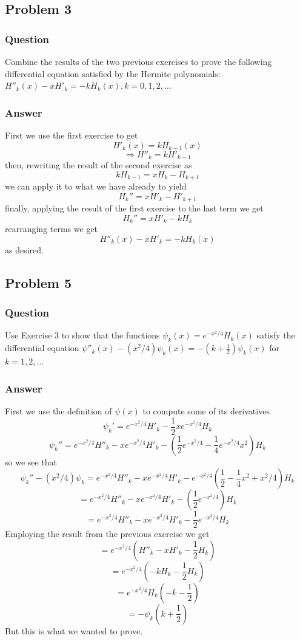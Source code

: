 \documentclass[12pt]{article}
\begin{document}
\subsection{Problem 3}
\subsubsection{Question}

Combine the results of the two previous exercises to prove the following differential equation satisfied by the Hermite polynomials: $H''_k(x)-xH'_k=-kH_k(x), k=0,1,2,\dots$

\subsubsection{Answer}

First we use the first exercise to get 
\[H'_k(x)=kH_{k-1}(x)\]
\[\Rightarrow H''_k=kH'_{k-1}\]
then, rewriting the result of the second exercise as
\[k H_{k-1}=xH_k-H_{k+1}\]
we can apply it to what we have already to yield
\[H_k''=xH'_k-H'_{k+1}\]
finally, applying the result of the first exercise to the last term we get
\[H_k''=xH'_k-kH_{k}\]
rearranging terms we get
\[H''_k(x)-xH'_k=-kH_k(x)\]
as desired.


\subsection{Problem 5}
\subsubsection{Question}

Use Exercise 3 to show that the functions $\psi_k(x)=e^{-x^2/4}H_k(x)$ satisfy the differential equation $\psi''_k (x)-(x^2/4)\psi_k (x) = -(k+\frac{1}{2} ) \psi_k (x)$ for $k=1,2,\dots$

\subsubsection{Answer}

First we use the definition of $\psi(x)$ to compute some of its derivatives
\[\psi_k'=e^{-x^2/4}H'_k-\frac{1}{2}xe^{-x^2/4}H_k\]
\[\psi_k''=e^{-x^2/4}H''_k-xe^{-x^2/4}H'_k- \left( \frac{1}{2}e^{-x^2/4}-\frac{1}{4}e^{-x^2/4}x^2 \right) H_k\]
so we see that 
\[\psi_k''-(x^2/4)\psi_k=e^{-x^2/4}H''_k-xe^{-x^2/4}H'_k- e^{-x^2/4}\left( \frac{1}{2}-\frac{1}{4}x^2+x^2/4 \right) H_k\]
\[=e^{-x^2/4}H''_k-xe^{-x^2/4}H'_k- \left( \frac{1}{2}e^{-x^2/4}\right) H_k\]
\[=e^{-x^2/4}H''_k-xe^{-x^2/4}H'_k- \frac{1}{2}e^{-x^2/4}  H_k\]
Employing the result from the previous exercise we get
\[=e^{-x^2/4}\left( H''_k-x H'_k- \frac{1}{2}  H_k \right)\]
\[=e^{-x^2/4}\left(-kH_k- \frac{1}{2}  H_k \right)\]
\[=e^{-x^2/4} H_k \left(-k- \frac{1}{2}  \right)\]
\[=- \psi_k \left(k+ \frac{1}{2}  \right)\]
But this is what we wanted to prove.
\end{document}

